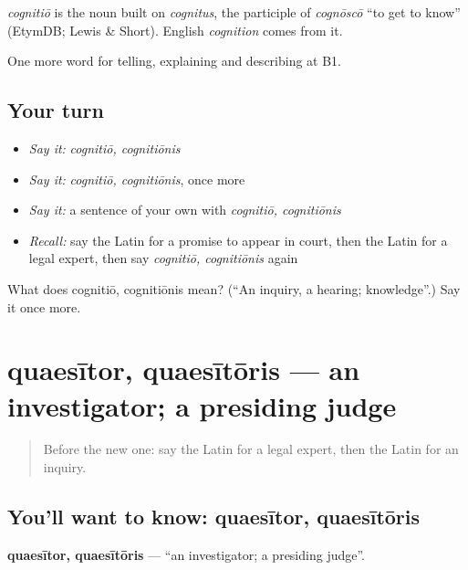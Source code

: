 \begin{cousinweb}
\emph{cognitiō} is the noun built on \emph{cognitus}, the participle of \emph{cognōscō} \textquotedblleft{}to get to know\textquotedblright{} (EtymDB; Lewis \& Short). English \emph{cognition} comes from it.
\end{cousinweb}

\begin{grammarlens}[title={What you've built}]
One more word for telling, explaining and describing at B1.
\end{grammarlens}

\subsection*{Your turn}
\begin{itemize}
\raggedright
  \item \emph{Say it:} \emph{cognitiō, cognitiōnis}
  \item \emph{Say it:} \emph{cognitiō, cognitiōnis}, once more
  \item \emph{Say it:} a sentence of your own with \emph{cognitiō, cognitiōnis}
  \item \emph{Recall:} say the Latin for a promise to appear in court, then the Latin for a legal expert, then say \emph{cognitiō, cognitiōnis} again
\end{itemize}

\begin{tcolorbox}[breakable,colback=teal!4,colframe=teal!35!black,title={Before you move on}]
What does cognitiō, cognitiōnis mean? (\textquotedblleft{}An inquiry, a hearing; knowledge\textquotedblright{}.) Say it once more.
\end{tcolorbox}
\section[quaesītor, quaesītōris]{quaesītor, quaesītōris — an investigator; a presiding judge}

\label{lesson:LA-C412-quaesitor}



\begin{quote}
Before the new one: say the Latin for a legal expert, then the Latin for an inquiry.
\end{quote}

\subsection*{You'll want to know: quaesītor, quaesītōris}
\textbf{quaesītor, quaesītōris} — \textquotedblleft{}an investigator; a presiding judge\textquotedblright{}.

